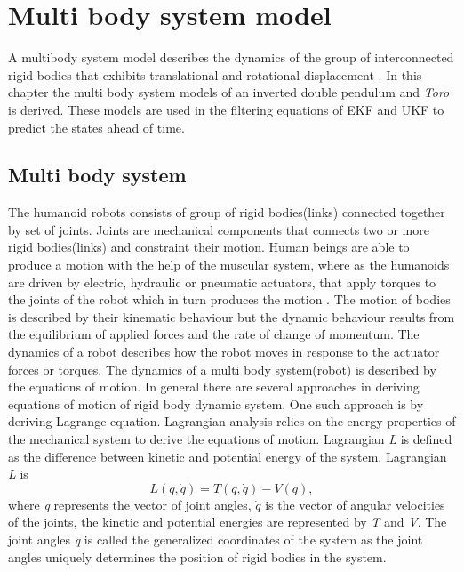 \chapter{Multi body system model}
\label{ch:multi_mdl}
A multibody system model describes the dynamics of the group of interconnected rigid bodies that exhibits translational and rotational displacement \citep{mur94}. In this chapter the multi body system models of an inverted double pendulum and \emph{Toro} is derived. These models are used in the filtering equations of EKF and UKF to predict the states ahead of time.
\section{Multi body system}
The humanoid robots consists of group of rigid bodies(links) connected together by set of joints. Joints are mechanical components that connects two or more rigid bodies(links) and constraint their motion. Human beings are able to produce a motion with the help of the muscular system, where as the humanoids are driven by electric, hydraulic or pneumatic actuators, that apply torques to the joints of the robot which in turn produces the motion \cite[Chapter 2]{mur94}. The motion of bodies is described by their kinematic behaviour but the dynamic behaviour results from the equilibrium of applied forces and the rate of change of momentum. The dynamics of a robot describes how the robot moves in response to the actuator forces or torques. The dynamics of a multi body system(robot) is described by the equations of motion. In general there are several approaches in deriving equations of motion of rigid body dynamic system. One such approach is by deriving Lagrange equation. Lagrangian analysis relies on the energy properties of the mechanical system to derive the equations of motion. Lagrangian \emph{L} is defined as the difference between kinetic and potential energy of the system. Lagrangian \emph{L} is $$ L(q,\dot{q}) = T(q,\dot{q}) - V(q),$$ 
where \emph{q} represents the vector of joint angles, $\dot{q}$ is the vector of angular velocities of the joints, the kinetic and potential energies are represented by \emph{T} and \emph{V}. The joint angles \emph{q} is called the generalized coordinates of the system as the joint angles uniquely determines the position of rigid bodies in the system.

